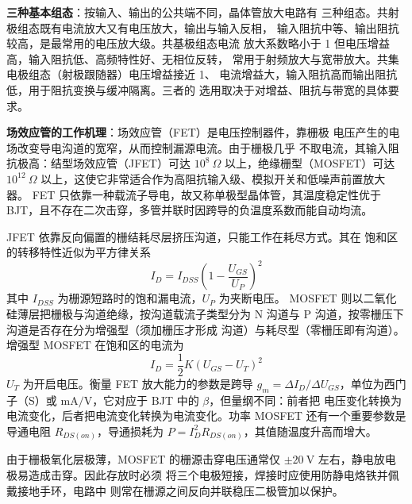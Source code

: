 \textbf{三种基本组态}：按输入、输出的公共端不同，晶体管放大电路有
三种组态。共射极组态既有电流放大又有电压放大，输出与输入反相，
输入阻抗中等、输出阻抗较高，是最常用的电压放大级。共基极组态电流
放大系数略小于 1 但电压增益高，输入阻抗低、高频特性好、无相位反转，
常用于射频放大与宽带放大。共集电极组态（射极跟随器）电压增益接近 1、
电流增益大，输入阻抗高而输出阻抗低，用于阻抗变换与缓冲隔离。三者的
选用取决于对增益、阻抗与带宽的具体要求。

\textbf{场效应管的工作机理}：场效应管（FET）是电压控制器件，靠栅极
电压产生的电场改变导电沟道的宽窄，从而控制漏源电流。由于栅极几乎
不取电流，其输入阻抗极高：结型场效应管（JFET）可达
$10^{8}\ \Omega$ 以上，绝缘栅型（MOSFET）可达 $10^{12}\ \Omega$
以上，这使它非常适合作为高阻抗输入级、模拟开关和低噪声前置放大器。
FET 只依靠一种载流子导电，故又称单极型晶体管，其温度稳定性优于
BJT，且不存在二次击穿，多管并联时因跨导的负温度系数而能自动均流。

JFET 依靠反向偏置的栅结耗尽层挤压沟道，只能工作在耗尽方式。其在
饱和区的转移特性近似为平方律关系
\begin{equation}
I_D = I_{DSS}\left(1 - \frac{U_{GS}}{U_P}\right)^{2}
\end{equation}
其中 $I_{DSS}$ 为栅源短路时的饱和漏电流，$U_P$ 为夹断电压。
MOSFET 则以二氧化硅薄层把栅极与沟道绝缘，按沟道载流子类型分为
N 沟道与 P 沟道，按零栅压下沟道是否存在分为增强型（须加栅压才形成
沟道）与耗尽型（零栅压即有沟道）。增强型 MOSFET 在饱和区的电流为
\[
I_D = \frac{1}{2}K\left(U_{GS} - U_{T}\right)^{2}
\]
$U_T$ 为开启电压。衡量 FET 放大能力的参数是跨导
$g_m = \Delta I_D/\Delta U_{GS}$，单位为西门子（S）或
$\mathrm{mA/V}$，它对应于 BJT 中的 $\beta$，但量纲不同：前者把
电压变化转换为电流变化，后者把电流变化转换为电流变化。功率
MOSFET 还有一个重要参数是导通电阻 $R_{DS(on)}$，导通损耗为
$P = I_D^2 R_{DS(on)}$，其值随温度升高而增大。

由于栅极氧化层极薄，MOSFET 的栅源击穿电压通常仅
$\pm20\ \mathrm{V}$ 左右，静电放电极易造成击穿。因此存放时必须
将三个电极短接，焊接时应使用防静电烙铁并佩戴接地手环，电路中
则常在栅源之间反向并联稳压二极管加以保护。

